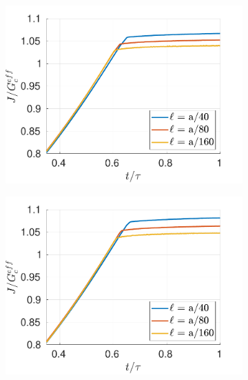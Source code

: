\begin{figure}[h]
\begin{subfigure}{.33\textwidth}
  \centering
  \includegraphics[width=\linewidth]{images/2d_propagation/zoom_gary_I_d.pdf}
  \caption{}
  \label{fig:prop_gary_d}
\end{subfigure}%
\begin{subfigure}{.33\textwidth}
  \centering
  \includegraphics[width=\linewidth]{images/2d_propagation/zoom_gary_I_d2.pdf}
  \caption{}
  \label{fig:prop_gary_d2}
\end{subfigure}%
\begin{subfigure}{.33\textwidth}
  \centering

\end{subfigure}
\end{figure}
